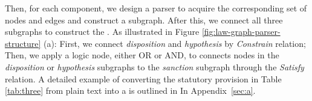 Then, for each component, we design a parser to acquire the corresponding set of nodes and edges and construct a subgraph. After this, we connect all three subgraphs to construct the \lawgraph{}. As illustrated in Figure \ref{fig:law-graph-parser-structure} (a): First, we connect \textit{disposition} and \textit{hypothesis} by \textit{Constrain} relation; Then, we apply a logic node, either OR or AND, to connects nodes in the \textit{disposition} or \textit{hypothesis} subgraphs to the \textit{sanction} subgraph through the \textit{Satisfy} relation.
A detailed example of converting the statutory provision in Table \ref{tab:three} from plain text into a \lawgraph{} is outlined in In Appendix~\ref{sec:a}.

